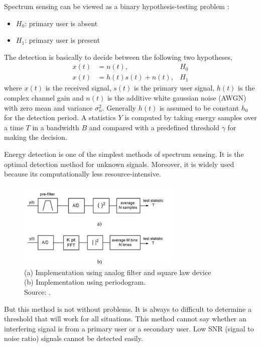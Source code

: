 Spectrum sensing can be viewed as a binary hypothesis-testing problem 
\cite{zhang09}:
\begin{itemize}[noitemsep,topsep=0pt,parsep=0pt,partopsep=0pt]
    \item $H_0$: primary user is absent
    \item $H_1$: primary user is present
\end{itemize}
The detection is basically to decide between the following two hypotheses,
\begin{align}
    x(t) &= n(t), & H_0 \nonumber \\
    x(t) &= h(t)s(t) + n(t), & H_1 \nonumber
\end{align}
where $x(t)$ is the received signal, $s(t)$ is the primary user signal, $h(t)$
is the complex channel gain and $n(t)$ is the additive white gaussian noise
(AWGN) with zero mean and variance $\sigma_n^2$. Generally $h(t)$ is assumed
to be constant $h_0$ for the detection period. A statistics $Y$ is computed by
taking energy samples over a time $T$ in a bandwidth $B$ and compared with a 
predefined threshold $\gamma$ for making the decision.

Energy detection is one of the simplest methods of spectrum sensing. It is the 
optimal detection method for unknown signals. Moreover, it is widely used 
because its computationally less resource-intensive.

\begin{figure}
    \centering
    \includegraphics[width=0.7\textwidth]{energyDetection}
    \caption[Energy Detection block diagram]{(a) Implementation using analog 
    filter and square law device \\
    (b) Implementation using periodogram. \\
    Source: {\cite{cabric06}}.}
    \label{energyDetection}
\end{figure}

But this method is not without problems. It is always to difficult to 
determine a threshold that will work for all situations. This method cannot
say whether an interfering signal is from a primary user or a secondary user.
Low SNR (signal to noise ratio) signals cannot be detected easily.

